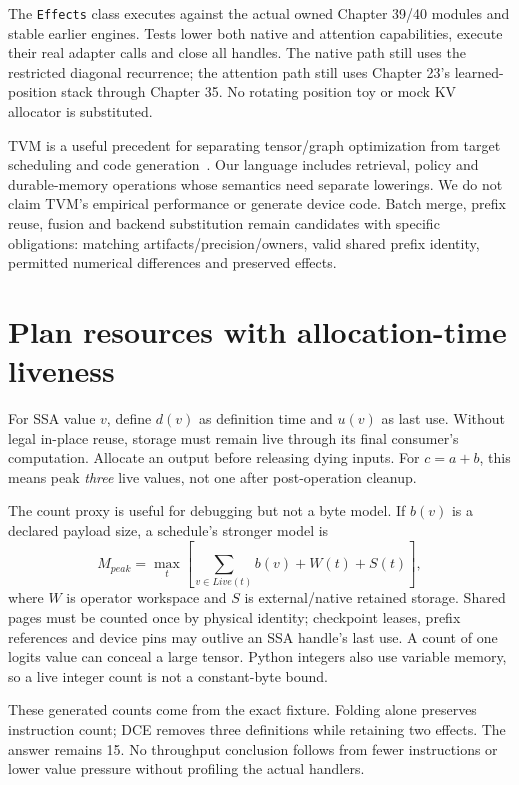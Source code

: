 The \texttt{Effects} class executes against the actual owned Chapter 39/40
modules and stable earlier engines. Tests lower both native and attention
capabilities, execute their real adapter calls and close all handles. The
native path still uses the restricted diagonal recurrence; the attention path
still uses Chapter 23's learned-position stack through Chapter 35. No rotating
position toy or mock KV allocator is substituted.

TVM is a useful precedent for separating tensor/graph optimization from
target scheduling and code generation~\cite{evod41:tvm}. Our language includes
retrieval, policy and durable-memory operations whose semantics need separate
lowerings. We do not claim TVM's empirical performance or generate device code.
Batch merge, prefix reuse, fusion and backend substitution remain candidates
with specific obligations: matching artifacts/precision/owners, valid shared
prefix identity, permitted numerical differences and preserved effects.

\section{Plan resources with allocation-time liveness}
\label{evod41:liveness}
For SSA value $v$, define $d(v)$ as definition time and $u(v)$ as last use.
Without legal in-place reuse, storage must remain live through its final
consumer's computation. Allocate an output before releasing dying inputs.
For $c=a+b$, this means peak \emph{three} live values, not one after
post-operation cleanup.

The count proxy is useful for debugging but not a byte model. If $b(v)$ is a
declared payload size, a schedule's stronger model is
\[
 M_{peak}=\max_t\left[\sum_{v\in Live(t)} b(v)+W(t)+S(t)\right],
\]
where $W$ is operator workspace and $S$ is external/native retained storage.
Shared pages must be counted once by physical identity; checkpoint leases,
prefix references and device pins may outlive an SSA handle's last use.
A count of one logits value can conceal a large tensor. Python integers
also use variable memory, so a live integer count is not a constant-byte bound.

\begin{center}\end{center}
These generated counts come from the exact fixture. Folding alone preserves
instruction count; DCE removes three definitions while retaining two effects.
The answer remains 15. No throughput conclusion follows from fewer instructions
or lower value pressure without profiling the actual handlers.


